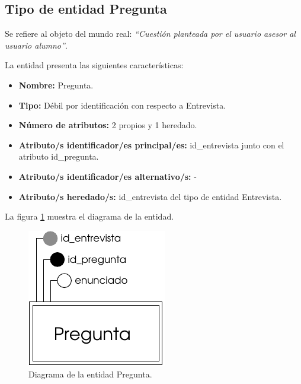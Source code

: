 \subsection{Tipo de entidad Pregunta}

   \begin{description}

   \item[Definición] Se refiere al objeto del mundo real: \emph{``Cuestión planteada por el usuario asesor al usuario alumno''}.

   \item[Características] La entidad presenta las siguientes características:
      \begin{itemize}
         \item \textbf{Nombre:} Pregunta.
         \item \textbf{Tipo:} Débil por identificación con respecto a Entrevista.
         \item \textbf{Número de atributos:} 2 propios y 1 heredado.
         \item \textbf{Atributo/s identificador/es principal/es:} id\_entrevista
         junto con el atributo id\_pregunta.
         \item \textbf{Atributo/s identificador/es alternativo/s:} -
         \item \textbf{Atributo/s heredado/s:} id\_entrevista del tipo de
         entidad Entrevista.
      \end{itemize}

   \item[Diagrama] La figura \ref{diagramaPregunta} muestra el diagrama de la entidad.
   \item \begin{figure}[!ht]
            \begin{center}
            \includegraphics[]{07.Modelo_Entidad-Interrelacion/7.2.Analisis_Entidades/diagramas/pregunta.pdf}
            \caption{Diagrama de la entidad Pregunta.}
            \label{diagramaPregunta}
            \end{center}
         \end{figure}


\end{description}
